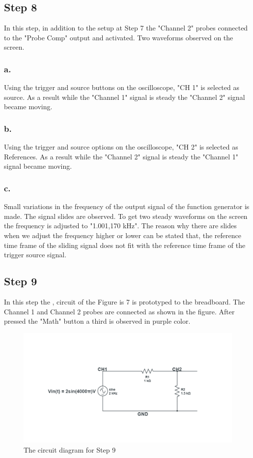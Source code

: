 \documentclass[letterpaper,12pt]{article}
\begin{document}
\subsection{Step 8}
In this step, in addition to the setup at Step 7 the "Channel 2" probes connected to the "Probe Comp" output and activated. Two waveforms observed on the screen.
\subsubsection{a.}
Using the trigger and source buttons on the oscilloscope, "CH 1" is selected as source. As a result while the "Channel 1" signal is steady the "Channel 2" signal became moving. 
\subsubsection{b.}
Using the trigger and source options on the oscilloscope, "CH 2" is selected as References. As a result while the "Channel 2" signal is steady the "Channel 1" signal became moving. 
\subsubsection{c.}
Small variations in the frequency of the output signal of the function generator is made. The signal slides are observed. To get two steady waveforms on the screen the frequency is adjusted to "1.001,170 kHz". The reason why there are slides when we adjust the frequency higher or lower can be stated that,  the reference time frame of the sliding signal does not fit with the reference time frame of the trigger source signal.

\subsection{Step 9}
In this step the , circuit of the Figure is 7 is prototyped to the breadboard. The Channel 1 and Channel 2 probes are connected  as shown in the figure. After pressed the "Math" button a third is observed in purple color. 
\begin{figure}[!ht]
	\caption{ The circuit diagram for Step 9  }
	\centering
	\includegraphics[width=1\textwidth]{9circuit.png}
\end{figure}
\end{document}
